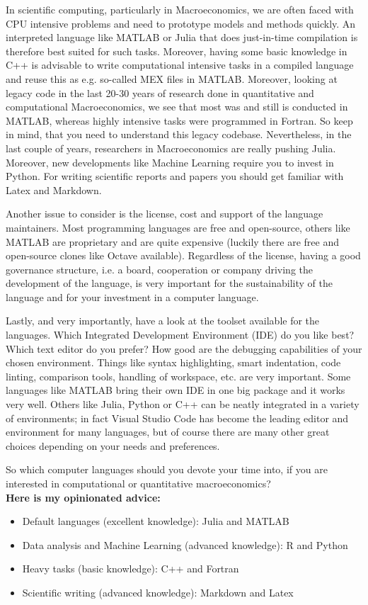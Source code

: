 \begin{enumerate}
	In scientific computing, particularly in Macroeconomics,
	  we are often faced with CPU intensive problems 
	  and need to prototype models and methods quickly.
	An interpreted language like MATLAB or Julia that does just-in-time compilation
	  is therefore best suited for such tasks.
	Moreover, having some basic knowledge in C++ is advisable
	  to write computational intensive tasks in a compiled language 
	  and reuse this as e.g. so-called MEX files in MATLAB.
	Moreover, looking at legacy code in the last 20-30 years of research done
	  in quantitative and computational Macroeconomics,
	  we see that most was and still is conducted in MATLAB,
	  whereas highly intensive tasks were programmed in Fortran.
	So keep in mind, that you need to understand this legacy codebase.
	Nevertheless, in the last couple of years, researchers in Macroeconomics are really pushing Julia.
	Moreover, new developments like Machine Learning require you to invest in Python.
	For writing scientific reports and papers you should get familiar with Latex and Markdown.
	
	Another issue to consider is the license, cost and support of the language maintainers.
	Most programming languages are free and open-source,
	  others like MATLAB are proprietary and are quite expensive
	  (luckily there are free and open-source clones like Octave available).
	Regardless of the license, having a good governance structure,
	  i.e. a board, cooperation or company driving the development of the language,
	  is very important for the sustainability of the language
	  and for your investment in a computer language.
			
	Lastly, and very importantly, have a look at the toolset available for the languages.
	Which Integrated Development Environment (IDE) do you like best?
	Which text editor do you prefer?
	How good are the debugging capabilities of your chosen environment.
	Things like syntax highlighting, smart indentation, code linting, comparison tools,
	  handling of workspace, etc. are very important.
	Some languages like MATLAB bring their own IDE in one big package and it works very well.
	Others like Julia, Python or C++ can be neatly integrated in a variety of environments;
	  in fact Visual Studio Code has become the leading editor and environment for many languages,
	  but of course there are many other great choices depending on your needs and preferences.
	
	So which computer languages should you devote your time into,
	  if you are interested in computational or quantitative macroeconomics?
	\\
	\textbf{Here is my opinionated advice:}
	\begin{itemize}
		\item Default languages (excellent knowledge): Julia and MATLAB
		\item Data analysis and Machine Learning (advanced knowledge): R and Python
		\item Heavy tasks (basic knowledge): C++ and Fortran
		\item Scientific writing (advanced knowledge): Markdown and Latex
	\end{itemize}
\end{enumerate}